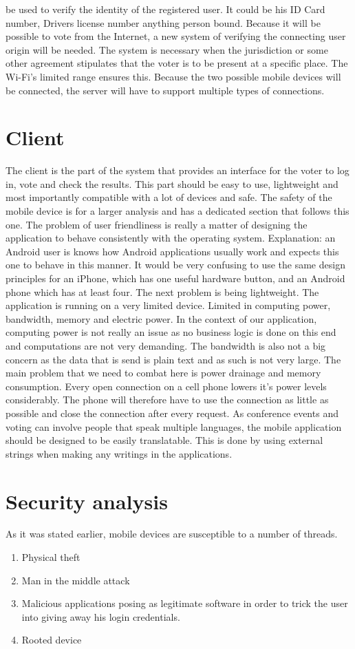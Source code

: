 \documentclass[11pt,twoside,a4paper]{book}
\begin{document}
be used to verify the identity of the registered user. It could be his ID Card number, Drivers license number anything person bound. Because it will be possible to vote from the Internet, a new system of verifying the connecting user origin will be needed. The system is necessary when the jurisdiction or some other agreement stipulates that the voter is to be present at a specific place. The Wi-Fi's limited range ensures this. Because the two possible mobile devices will be connected, the server will have to support multiple types of connections.

\section{Client}
The client is the part of the system that provides an interface for the voter to log in, vote and check the results. This part should be easy to use, lightweight and most importantly compatible with a lot of devices and safe. The safety of the mobile device is for a larger analysis and has a dedicated section that follows this one. The problem of user friendliness is really a matter of designing the application to behave consistently with the operating system. Explanation: an Android user is knows how Android applications usually work and expects this one to behave in this manner. It would be very confusing to use the same design principles for an iPhone, which has one useful hardware button, and an Android phone which has at least four. The next problem is being lightweight. The application is running on a very limited device. Limited in computing power, bandwidth, memory and electric power. In the context of our application, computing power is not really an issue as no business logic is done on this end and computations are not very demanding. The bandwidth is also not a big concern as the data that is send is plain text and as such is not very large. The main problem that we need to combat here is power drainage and memory consumption. Every open connection on a cell phone lowers it's power levels considerably. The phone will therefore have to use the connection as little as possible and close the connection after every request. As conference events and voting can involve people that speak multiple languages, the mobile application should be designed to be easily translatable. This is done by using external strings when making any writings in the applications. 	


\section{Security analysis}
\label{sec:security}
As it was stated earlier, mobile devices are susceptible to a number of threads. 
\begin{enumerate}
\item Physical theft
\item Man in the middle attack
\item Malicious applications posing as legitimate software in order to trick the user into giving away his login credentials.
\item Rooted device
\end{enumerate}
\end{document}

